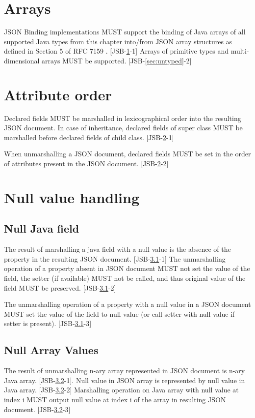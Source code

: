 \section{Arrays}
\label{sec:arrays}
JSON Binding implementations MUST support the binding of Java arrays of all supported Java types from this chapter into/from JSON array structures as defined in Section 5 of RFC 7159 \cite{rfc7159}. [JSB-\ref{sec:arrays}-1] Arrays of primitive types and multi-dimensional arrays MUST be supported. [JSB-\ref{sec:untyped}-2]

\section{Attribute order}
\label{sec:attributes}

Declared fields MUST be marshalled in lexicographical order into the resulting JSON document. In case of inheritance, declared fields of super class MUST be marshalled before declared fields of child class. [JSB-\ref{sec:attributes}-1]

When unmarshalling a JSON document, declared fields MUST be set in the order of attributes present in the JSON document. [JSB-\ref{sec:attributes}-2]

\section{Null value handling}
\label{sec:null}

\subsection{Null Java field}
\label{subsec:nullfield}
The result of marshalling a java field with a null value is the absence of the property in the resulting JSON document. [JSB-\ref{subsec:nullfield}-1]
The unmarshalling operation of a property absent in JSON document MUST not set the value of the field, the setter (if available) MUST not be called, and thus original value of the field MUST be preserved. [JSB-\ref{subsec:nullfield}-2]

The unmarshalling operation of a property with a null value in a JSON document MUST set the value of the field to null value (or call setter with null value if setter is present). [JSB-\ref{subsec:nullfield}-3]

\subsection{Null Array Values}
\label{subsec:nullarray}
The result of unmarshalling n-ary array represented in JSON document is n-ary Java array. [JSB-\ref{subsec:nullarray}-1]. Null value in JSON array is represented by null value in Java array. [JSB-\ref{subsec:nullarray}-2]
Marshalling operation on Java array with null value at index i MUST output null value at index i of the array in resulting JSON document. [JSB-\ref{subsec:nullarray}-3]

